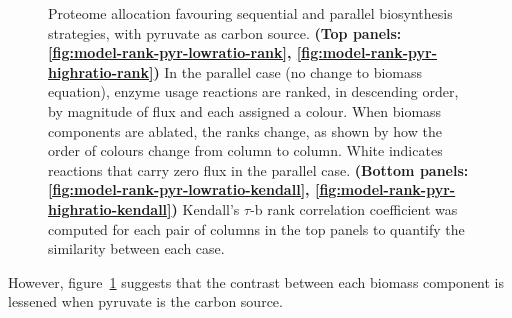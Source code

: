 \begin{figure}
  \caption{
    Proteome allocation favouring sequential and parallel biosynthesis strategies, with pyruvate as carbon source.
    \textbf{(Top panels: \ref{fig:model-rank-pyr-lowratio-rank}, \ref{fig:model-rank-pyr-highratio-rank})} In the parallel case (no change to biomass equation), enzyme usage reactions are ranked, in descending order, by magnitude of flux and each assigned a colour.
    When biomass components are ablated, the ranks change, as shown by how the order of colours change from column to column.
    White indicates reactions that carry zero flux in the parallel case.
    \textbf{(Bottom panels: \ref{fig:model-rank-pyr-lowratio-kendall}, \ref{fig:model-rank-pyr-highratio-kendall})} Kendall's $\tau$-b rank correlation coefficient was computed for each pair of columns in the top panels to quantify the similarity between each case.
  }
  \label{fig:model-rank-pyr}
\end{figure}

However, figure~\ref{fig:model-rank-pyr} suggests that the contrast between each biomass component is lessened when pyruvate is the carbon source.

